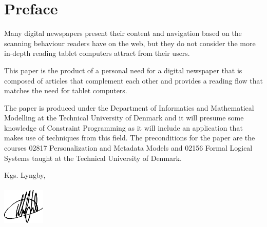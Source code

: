 

\begingroup
\let\clearpage\relax
\let\cleardoublepage\relax
\let\cleardoublepage\relax

\chapter*{Preface}
Many digital newspapers present their content and navigation based on the scanning behaviour readers have on the web, but they do not consider the more in-depth reading tablet computers attract from their users.

This paper is the product of a personal need for a digital newspaper that is composed of articles that complement each other and provides a reading flow that matches the need for tablet computers.

The paper is produced under the Department of Informatics and Mathematical Modelling at the Technical University of Denmark and it will presume some knowledge of Constraint Programming as it will include an application that makes use of techniques from this field. The preconditions for the paper are the courses 02817 Personalization and Metadata Models and 02156 Formal Logical Systems taught at the Technical University of Denmark.

\vspace{20mm}
\mbox{}\hfill
\begin{minipage}[t]{80mm}
  Kgs. Lyngby, \myTime
  \\ \vspace{-4mm} \\
  \mbox{} \hspace{8mm} \includegraphics[width=2cm]{img/signature}

  \hspace{8mm}
  \myName
\end{minipage}

\endgroup			

\vfill
